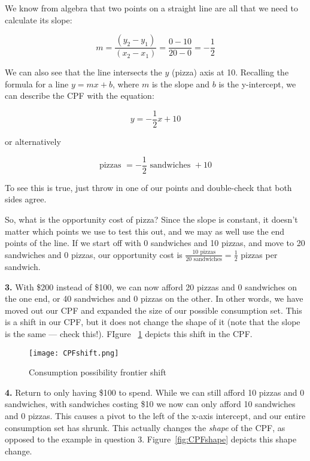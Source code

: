 \documentclass[12pt]{article}
\begin{document}
\medskip

We know from algebra that two points on a straight line are all that we need to calculate its slope:

$$
m = \dfrac{(y_2 - y_1)}{(x_2 - x_1)} = \dfrac{0 - 10}{20 - 0} = - \frac{1}{2}
$$

We can also see that the line intersects the $y$ (pizza) axis at 10. Recalling the formula for a line $y = mx + b$, where $m$ is the slope and $b$ is the y-intercept, we can describe the CPF with the equation:

$$
y = -\frac{1}{2}x + 10
$$

or alternatively

$$
\text{pizzas } = -\frac{1}{2} \text{ sandwiches } + 10
$$

To see this is true, just throw in one of our points and double-check that both sides agree.

\medskip

So, what is the opportunity cost of pizza? Since the slope is constant, it doesn't matter which points we use to test this out, and we may as well use the end points of the line. If we start off with 0 sandwiches and 10 pizzas, and move to 20 sandwiches and 0 pizzas, our opportunity cost is $\frac{10 \text{ pizzas}}{20 \text{ sandwiches}} = \frac{1}{2}$ pizzas per sandwich.

\medskip

\textbf{3.} With \$200 instead of \$100, we can now afford 20 pizzas and 0 sandwiches on the one end, or 40 sandwiches and 0 pizzas on the other. In other words, we have moved out our CPF and expanded the size of our possible consumption set. This is a shift in our CPF, but it does not change the shape of it (note that the slope is the same --- check this!). FIgure ~\ref{fig:CPFshift} depicts this shift in the CPF.

\begin{figure}[H]
    \centering
    \texttt{[image: CPFshift.png]}
    \caption{Consumption possibility frontier shift}
    \label{fig:CPFshift}
\end{figure}

\medskip

\textbf{4.} Return to only having \$100 to spend. While we can still afford 10 pizzas and 0 sandwiches, with sandwiches costing \$10 we now can only afford 10 sandwiches and 0 pizzas. This causes a pivot to the left of the x-axis intercept, and our entire consumption set has shrunk. This actually changes the \textit{shape} of the CPF, as opposed to the example in question 3. Figure~\ref{fig:CPFshape} depicts this shape change.
\end{document}
